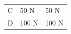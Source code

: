 \begin{enumerate}[noitemsep, label=\textbf{\arabic*}. ]
{\begin{tabular}[t]{|l|l|l|}
    
        C &
    
    
        50 N &
    
    
        50 N%
     \tabularnewline\cline{1-1}\cline{2-2}\cline{3-3}
    
    
        D &
    
    
        100 N &
    
    
        100 N%
     \tabularnewline\cline{1-1}\cline{2-2}\cline{3-3}
    \end{tabular}} %
\end{enumerate}
